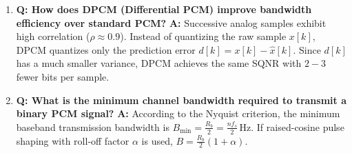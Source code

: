 \documentclass[11pt,a4paper]{article}
\begin{document}
\begin{enumerate}
    \item \textbf{Q: How does DPCM (Differential PCM) improve bandwidth efficiency over standard PCM?}  
    \textbf{A:} Successive analog samples exhibit high correlation ($\rho \approx 0.9$). Instead of quantizing the raw sample $x[k]$, DPCM quantizes only the prediction error $d[k] = x[k] - \hat{x}[k]$. Since $d[k]$ has a much smaller variance, DPCM achieves the same SQNR with $2 - 3$ fewer bits per sample.

    \item \textbf{Q: What is the minimum channel bandwidth required to transmit a binary PCM signal?}  
    \textbf{A:} According to the Nyquist criterion, the minimum baseband transmission bandwidth is $B_{\min} = \frac{R_b}{2} = \frac{n f_s}{2}\,\mathrm{Hz}$. If raised-cosine pulse shaping with roll-off factor $\alpha$ is used, $B = \frac{R_b}{2}(1 + \alpha)$.
\end{enumerate}
\end{document}
